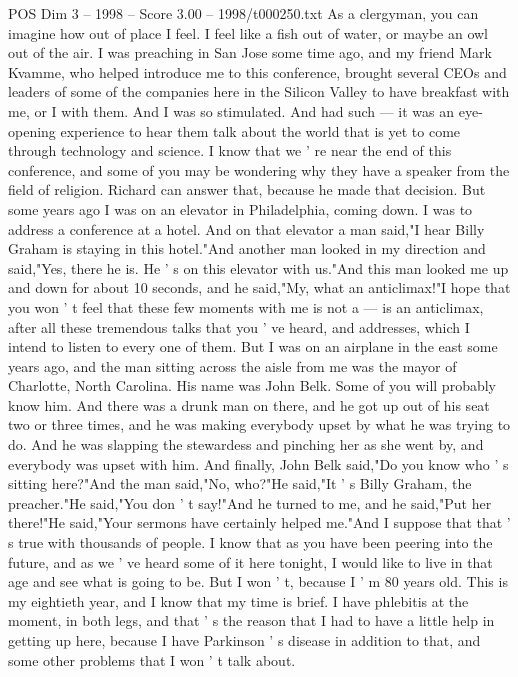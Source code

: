 \begin{textsample}{POS Dim 3 – 1998 – Score 3.00 – 1998/t000250.txt}  \label{ex:f3_pos_079}
As a clergyman, you can imagine how out of place I feel.
I feel like a fish out of water, or maybe an owl out of the air.
I was preaching in San Jose some time ago, and my friend Mark Kvamme, who helped introduce me to this conference, brought several CEOs and leaders of some of the companies here in the Silicon Valley to have breakfast with me, or I with them.
And I was so stimulated.
And had such — it was an eye-opening experience to hear them talk about the world that is yet to come through technology and science.
I know that we ' re near the end of this conference, and some of you may be wondering why they have a speaker from the field of religion.
Richard can answer that, because he made that decision.
But some years ago I was on an elevator in Philadelphia, coming down.
I was to address a conference at a hotel.
And on that elevator a man said,"I hear Billy Graham is staying in this hotel."And another man looked in my direction and said,"Yes, there he is.
He ' s on this elevator with us."And this man looked me up and down for about 10 seconds, and he said,"My, what an anticlimax!"I hope that you won ' t feel that these few moments with me is not a — is an anticlimax, after all these tremendous talks that you ' ve heard, and addresses, which I intend to listen to every one of them.
But I was on an airplane in the east some years ago, and the man sitting across the aisle from me was the mayor of Charlotte, North Carolina.
His name was John Belk.
Some of you will probably know him.
And there was a drunk man on there, and he got up out of his seat two or three times, and he was making everybody upset by what he was trying to do.
And he was slapping the stewardess and pinching her as she went by, and everybody was upset with him.
And finally, John Belk said,"Do you know who ' s sitting here?"And the man said,"No, who?"He said,"It ' s Billy Graham, the preacher."He said,"You don ' t say!"And he turned to me, and he said,"Put her there!"He said,"Your sermons have certainly helped me."And I suppose that that ' s true with thousands of people.
I know that as you have been peering into the future, and as we ' ve heard some of it here tonight, I would like to live in that age and see what is going to be.
But I won ' t, because I ' m 80 years old.
This is my eightieth year, and I know that my time is brief.
I have phlebitis at the moment, in both legs, and that ' s the reason that I had to have a little help in getting up here, because I have Parkinson ' s disease in addition to that, and some other problems that I won ' t talk about.

\end{textsample}
